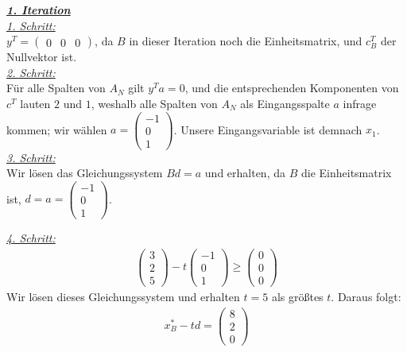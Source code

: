 \documentclass [a4paper,11pt]{article}
\begin{document}
\begin{enumerate}
\begin{enumerate}
            \underline{\textbf{\textit{1. Iteration}}}\\
            \underline{\textit{1. Schritt:}}\\
            $y^T = \begin{pmatrix} 0 & 0 & 0 \end{pmatrix}$, da $B$ in dieser Iteration noch die Einheitsmatrix, und $c^T_B$ der Nullvektor ist.\\
            
            \underline{\textit{2. Schritt:}}\\
            Für alle Spalten von $A_N$ gilt $y^T a = 0$, und die entsprechenden Komponenten von $c^T$ lauten $2$ und $1$, weshalb alle Spalten von $A_N$
            als Eingangsspalte $a$ infrage kommen; wir wählen $a = \begin{pmatrix} -1\\ 0\\ 1 \end{pmatrix}$.
            Unsere Eingangsvariable ist demnach $x_1$.\\

            \underline{\textit{3. Schritt:}}\\
            Wir lösen das Gleichungssystem $Bd=a$ und erhalten, da $B$ die Einheitsmatrix ist, $d=a=\begin{pmatrix} -1\\ 0\\ 1 \end{pmatrix}$.

            \newpage

            \underline{\textit{4. Schritt:}}\\
            \begin{align*}
                \begin{pmatrix}
                    3\\
                    2\\
                    5
                \end{pmatrix}
                - t
                \begin{pmatrix}
                    -1\\
                    0\\
                    1
                \end{pmatrix}
                \geq
                \begin{pmatrix}
                    0\\
                    0\\
                    0
                \end{pmatrix}
            \end{align*}
            Wir lösen dieses Gleichungssystem und erhalten $t=5$ als größtes $t$. Daraus folgt:
            \begin{align*}
                x^*_B - td = \begin{pmatrix} 8\\ 2\\ 0 \end{pmatrix}
            \end{align*}


\end{enumerate}
\end{enumerate}
\end{document}

